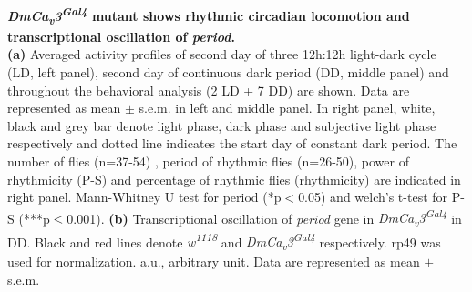 \label{fig:4}
\textbf{ \emph{DmCa\textsubscript{v}3\textsuperscript{Gal4}} mutant shows rhythmic circadian locomotion and transcriptional oscillation of \emph{period}.}
\\
\textbf{(a)} Averaged activity profiles of second day of three 12h:12h light-dark cycle (LD, left panel), second day of continuous dark period (DD, middle panel) and throughout the behavioral analysis (2 LD + 7 DD) are shown.
Data are represented as mean $\pm$ s.e.m. in left and middle panel.
In right panel, white, black and grey bar denote light phase, dark phase and subjective light phase respectively and dotted line indicates the start day of constant dark period. 
The number of flies (n=37-54) , period of rhythmic flies (n=26-50), power of rhythmicity (P-S) and percentage of rhythmic flies (rhythmicity) are indicated in right panel.
Mann-Whitney U test for period (*p$<$0.05) and welch's t-test for P-S (***p$<$0.001). 
\textbf{(b)} Transcriptional oscillation of \emph{period} gene in  \emph{DmCa\textsubscript{v}3\textsuperscript{Gal4}} in DD. Black and red lines denote \emph{w\textsuperscript{1118}} and \emph{DmCa\textsubscript{v}3\textsuperscript{Gal4}} respectively. rp49 was used for normalization.
a.u., arbitrary unit.
Data are represented as mean $\pm$ s.e.m.

  
  
  
  
  
  
  
  
  
  
  